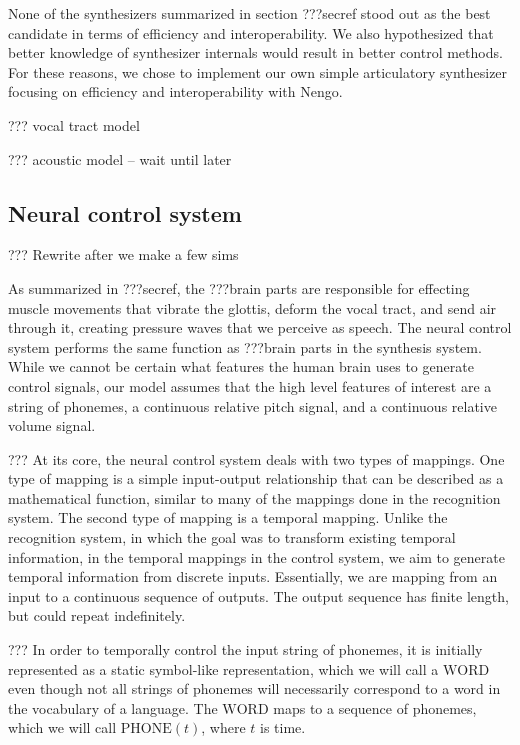 None of the synthesizers summarized in
section ???secref
stood out as the best candidate
in terms of efficiency and interoperability.
We also hypothesized that better knowledge
of synthesizer internals would
result in better control methods.
For these reasons,
we chose to implement our own
simple articulatory synthesizer focusing on
efficiency and interoperability with Nengo.

??? vocal tract model

??? acoustic model -- wait until later

\subsection{Neural control system}

??? Rewrite after we make a few sims

As summarized in ???secref,
the ???brain parts
are responsible for effecting
muscle movements that
vibrate the glottis,
deform the vocal tract,
and send air through it,
creating pressure waves
that we perceive as speech.
The neural control system
performs the same function as ???brain parts
in the synthesis system.
While we cannot be certain
what features the human brain
uses to generate control signals,
our model assumes that the
high level features of interest
are a string of phonemes,
a continuous relative pitch signal,
and a continuous relative volume signal.

??? At its core, the neural control system
deals with two types of mappings.
One type of mapping is a simple
input-output relationship
that can be described as a mathematical function,
similar to many of the mappings
done in the recognition system.
The second type of mapping is a temporal mapping.
Unlike the recognition system,
in which the goal was to
transform existing temporal information,
in the temporal mappings in the control system,
we aim to generate temporal information
from discrete inputs.
Essentially, we are mapping from
an input to a continuous sequence of outputs.
The output sequence has finite length,
but could repeat indefinitely.

??? In order to temporally control
the input string of phonemes,
it is initially represented
as a static symbol-like representation,
which we will call a $\text{WORD}$
even though not all strings of phonemes
will necessarily correspond
to a word in the vocabulary of a language.
The $\text{WORD}$ maps to a
sequence of phonemes,
which we will call
$\text{PHONE}(t)$,
where $t$ is time.

